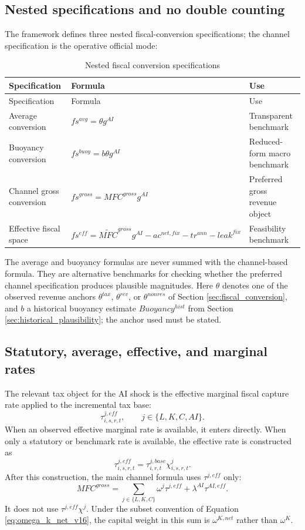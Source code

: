 \documentclass[11pt,a4paper]{article}
\begin{document}
\subsection{Nested specifications and no double counting}

The framework defines three nested fiscal-conversion specifications; the channel specification is the operative official mode:
\begin{longtable}{p{}p{}p{}}
\caption{Nested fiscal conversion specifications}\label{tab:fiscal_nested_specs}\\
\toprule
Specification & Formula & Use \\
\midrule
\endfirsthead
\toprule
Specification & Formula & Use \\
\midrule
\endhead
Average conversion & $fs^{avg}=\theta g^{AI}$ & Transparent benchmark \\
Buoyancy conversion & $fs^{buoy}=b\theta g^{AI}$ & Reduced-form macro benchmark \\
Channel gross conversion & $fs^{gross}=MFC^{gross}g^{AI}$ & Preferred gross revenue object \\
Effective fiscal space & $fs^{eff}=\widetilde{MFC}^{gross}g^{AI}-ac^{net,fix}-tr^{ann}-leak^{fix}$ & Feasibility benchmark \\
\bottomrule
\end{longtable}
The average and buoyancy formulas are never summed with the channel-based formula. They are alternative benchmarks for checking whether the preferred channel specification produces plausible magnitudes. Here $\theta$ denotes one of the observed revenue anchors $\theta^{tax}$, $\theta^{rev}$, or $\theta^{nonres}$ of Section \ref{sec:fiscal_conversion}, and $b$ a historical buoyancy estimate $Buoyancy^{hist}$ from Section \ref{sec:historical_plausibility}; the anchor used must be stated.

\subsection{Statutory, average, effective, and marginal rates}

The relevant tax object for the AI shock is the effective marginal fiscal capture rate applied to the incremental tax base:
\begin{equation}
    \tau^{j,eff}_{i,s,r,t},\qquad j\in\{L,K,C,AI\}.
\end{equation}
When an observed effective marginal rate is available, it enters directly. When only a statutory or benchmark rate is available, the effective rate is constructed as
\begin{equation}\label{eq:tau_eff_decomposition_v10}
    \tau^{j,eff}_{i,s,r,t}=\tau^{j,base}_{i,r,t}\chi^j_{i,s,r,t}.
\end{equation}
After this construction, the main channel formula uses $\tau^{j,eff}$ only:
\begin{equation}
    MFC^{gross}=\sum_{j\in\{L,K,C\}}\omega^j\tau^{j,eff}+\lambda^{AI}\tau^{AI,eff}.
\end{equation}
It does not use $\tau^{j,eff}\chi^j$. Under the subset convention of Equation \eqref{eq:omega_k_net_v16}, the capital weight in this sum is $\omega^{K,net}$ rather than $\omega^K$.
\end{document}
